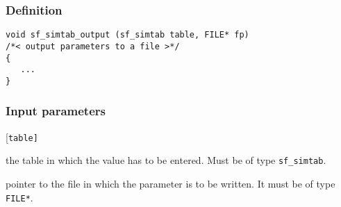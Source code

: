\subsubsection*{Definition}
\begin{verbatim}
void sf_simtab_output (sf_simtab table, FILE* fp) 
/*< output parameters to a file >*/
{
   ...
}
\end{verbatim}

\subsubsection*{Input parameters}
\begin{desclist}{\tt }{\quad}[\tt table]
   \setlength\itemsep{0pt}
   \item[table] the table in which the value has to be entered. Must be of type \texttt{sf\_simtab}. 
   \item[fp]    pointer to the file in which the parameter is to be written. It must be of type \texttt{FILE*}.
\end{desclist}




